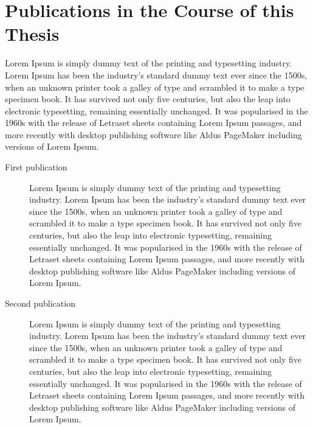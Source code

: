\section{Publications in the Course of this Thesis}

Lorem Ipsum is simply dummy text of the printing and typesetting industry. Lorem Ipsum has been the industry's standard dummy text ever since the 1500s, when an unknown printer took a galley of type and scrambled it to make a type specimen book. It has survived not only five centuries, but also the leap into electronic typesetting, remaining essentially unchanged. It was popularised in the 1960s with the release of Letraset sheets containing Lorem Ipsum passages, and more recently with desktop publishing software like Aldus PageMaker including versions of Lorem Ipsum.


\begin{description}
   \item[First publication] 
Lorem Ipsum is simply dummy text of the printing and typesetting industry. Lorem Ipsum has been the industry's standard dummy text ever since the 1500s, when an unknown printer took a galley of type and scrambled it to make a type specimen book. It has survived not only five centuries, but also the leap into electronic typesetting, remaining essentially unchanged. It was popularised in the 1960s with the release of Letraset sheets containing Lorem Ipsum passages, and more recently with desktop publishing software like Aldus PageMaker including versions of Lorem Ipsum.

   \item[Second publication] Lorem Ipsum is simply dummy text of the printing and typesetting industry. Lorem Ipsum has been the industry's standard dummy text ever since the 1500s, when an unknown printer took a galley of type and scrambled it to make a type specimen book. It has survived not only five centuries, but also the leap into electronic typesetting, remaining essentially unchanged. It was popularised in the 1960s with the release of Letraset sheets containing Lorem Ipsum passages, and more recently with desktop publishing software like Aldus PageMaker including versions of Lorem Ipsum.
\end{description}
